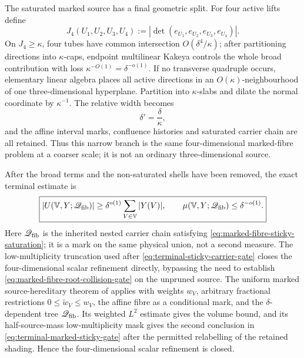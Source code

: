 \documentclass[11pt]{article}
\begin{document}
The saturated marked source has a final geometric split.  For four active
lifts define
\begin{equation}\label{eq:four-dimensional-marked-transversality}
 J_4(U_1,U_2,U_3,U_4)
 :=|\det(e_{U_1},e_{U_2},e_{U_3},e_{U_4})|.
\end{equation}
On \(J_4\ge\kappa\), four tubes have common intersection
\(O(\delta^4/\kappa)\); after partitioning directions into
\(\kappa\)-caps, endpoint multilinear Kakeya \cite{BCT06,Guth10} controls the whole broad
contribution with loss
\(\kappa^{-O(1)}=\delta^{-o(1)}\).  If no transverse quadruple occurs,
elementary linear algebra places all active directions in an
\(O(\kappa)\)-neighbourhood of one three-dimensional hyperplane.
Partition into \(\kappa\)-slabs and dilate the normal coordinate by
\(\kappa^{-1}\).  The relative width becomes
\begin{equation}\label{eq:four-dimensional-marked-narrow-rescaling}
 \delta'=\frac\delta\kappa,
\end{equation}
and the affine interval marks, confluence histories and saturated carrier
chain are all retained.  Thus this narrow branch is the same
four-dimensional marked-fibre problem at a coarser scale; it is not an
ordinary three-dimensional source.

After the broad terms and the non-saturated shells have been removed, the
exact terminal estimate is
\begin{equation}\label{eq:terminal-marked-sticky-gate}
 \boxed{
 |U(\mathbb V,Y;\mathscr Q_{\rm fib})|
 \ge\delta^{o(1)}\sum_{V\in\mathbb V}|Y(V)|,
 \qquad
 \mu(\mathbb V,Y;\mathscr Q_{\rm fib})
 \le\delta^{-o(1)}.}
\end{equation}
Here \(\mathscr Q_{\rm fib}\) is the inherited nested carrier chain
satisfying \eqref{eq:marked-fibre-sticky-saturation}; it is a mark on the
same physical union, not a second measure.  The low-multiplicity truncation
used after \eqref{eq:terminal-sticky-carrier-gate} closes the
four-dimensional scalar refinement directly, bypassing the need to establish
\eqref{eq:marked-fibre-root-collision-gate} on the unpruned source.
The uniform marked source-hereditary theorem of \cite{StickyContact4D}
applies with weights \(w_V\), arbitrary fractional restrictions
\(0\le\widetilde w_V\le w_V\), the affine fibre as a conditional mark, and
the \(\delta\)-dependent tree \(\mathscr Q_{\rm fib}\).  Its weighted
\(L^2\) estimate gives the volume bound, and its half-source-mass
low-multiplicity mask gives the second conclusion in
\eqref{eq:terminal-marked-sticky-gate} after the permitted relabelling of the
retained shading.  Hence the four-dimensional scalar
refinement is closed.
\end{document}
